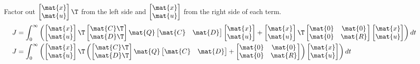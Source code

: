Factor out $\begin{bmatrix}\mat{x} \\ \mat{u}\end{bmatrix}\T$ from the left side
and $\begin{bmatrix}\mat{x} \\ \mat{u}\end{bmatrix}$ from the right side of each
term.
\begin{align*}
  J &= \int_0^\infty \left(
    \begin{bmatrix}
      \mat{x} \\
      \mat{u}
    \end{bmatrix}\T
    \begin{bmatrix}
      \mat{C}\T \\
      \mat{D}\T
    \end{bmatrix}
    \mat{Q}
    \begin{bmatrix}
      \mat{C} &
      \mat{D}
    \end{bmatrix}
    \begin{bmatrix}
      \mat{x} \\
      \mat{u}
    \end{bmatrix} +
    \begin{bmatrix}
      \mat{x} \\
      \mat{u}
    \end{bmatrix}\T
    \begin{bmatrix}
      \mat{0} & \mat{0} \\
      \mat{0} & \mat{R}
    \end{bmatrix}
    \begin{bmatrix}
      \mat{x} \\
      \mat{u}
    \end{bmatrix}
    \right) dt \\
  J &= \int_0^\infty \left(
    \begin{bmatrix}
      \mat{x} \\
      \mat{u}
    \end{bmatrix}\T
    \left(
    \begin{bmatrix}
      \mat{C}\T \\
      \mat{D}\T
    \end{bmatrix}
    \mat{Q}
    \begin{bmatrix}
      \mat{C} &
      \mat{D}
    \end{bmatrix} +
    \begin{bmatrix}
      \mat{0} & \mat{0} \\
      \mat{0} & \mat{R}
    \end{bmatrix}
    \right)
    \begin{bmatrix}
      \mat{x} \\
      \mat{u}
    \end{bmatrix}
    \right) dt
\end{align*}

